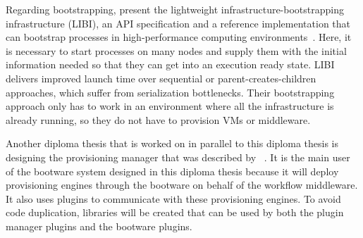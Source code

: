 Regarding bootstrapping, \citeauthor*{libi} present the lightweight infrastructure-bootstrapping infrastructure (LIBI), an API specification and a reference implementation that can bootstrap processes in high-performance computing environments~\autocite{libi}.
Here, it is necessary to start processes on many nodes and supply them with the initial information needed so that they can get into an execution ready state.
LIBI delivers improved launch time over sequential or parent-creates-children approaches, which suffer from serialization bottlenecks.
Their bootstrapping approach only has to work in an environment where all the infrastructure is already running, so they do not have to provision VMs or middleware.

Another diploma thesis that is worked on in parallel to this diploma thesis is designing the provisioning manager that was described by \citeauthor*{provisioning:dynamic}~\autocite{nedim}.
It is the main user of the bootware system designed in this diploma thesis because it will deploy provisioning engines through the bootware on behalf of the workflow middleware.
It also uses plugins to communicate with these provisioning engines.
To avoid code duplication, libraries will be created that can be used by both the plugin manager plugins and the bootware plugins.
